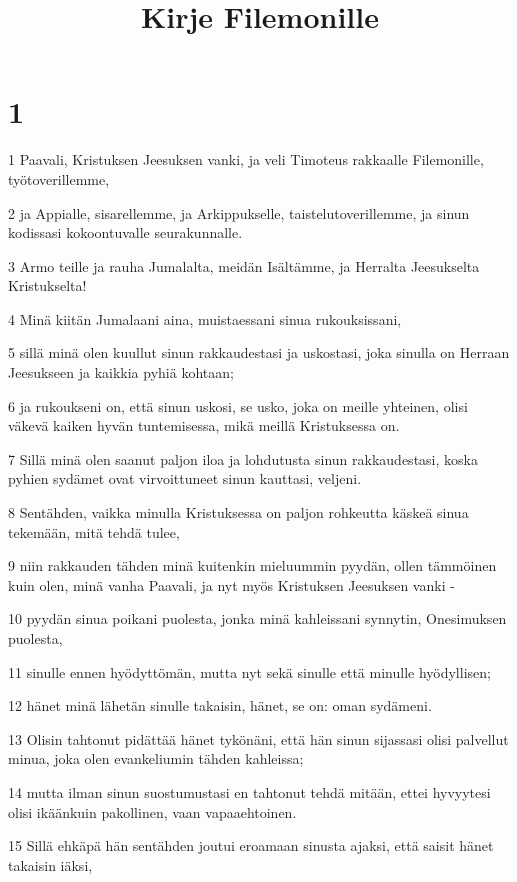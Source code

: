 

\title{Kirje Filemonille}


\chapter{1}

\par 1 Paavali, Kristuksen Jeesuksen vanki, ja veli Timoteus rakkaalle Filemonille, työtoverillemme,
\par 2 ja Appialle, sisarellemme, ja Arkippukselle, taistelutoverillemme, ja sinun kodissasi kokoontuvalle seurakunnalle.
\par 3 Armo teille ja rauha Jumalalta, meidän Isältämme, ja Herralta Jeesukselta Kristukselta!
\par 4 Minä kiitän Jumalaani aina, muistaessani sinua rukouksissani,
\par 5 sillä minä olen kuullut sinun rakkaudestasi ja uskostasi, joka sinulla on Herraan Jeesukseen ja kaikkia pyhiä kohtaan;
\par 6 ja rukoukseni on, että sinun uskosi, se usko, joka on meille yhteinen, olisi väkevä kaiken hyvän tuntemisessa, mikä meillä Kristuksessa on.
\par 7 Sillä minä olen saanut paljon iloa ja lohdutusta sinun rakkaudestasi, koska pyhien sydämet ovat virvoittuneet sinun kauttasi, veljeni.
\par 8 Sentähden, vaikka minulla Kristuksessa on paljon rohkeutta käskeä sinua tekemään, mitä tehdä tulee,
\par 9 niin rakkauden tähden minä kuitenkin mieluummin pyydän, ollen tämmöinen kuin olen, minä vanha Paavali, ja nyt myös Kristuksen Jeesuksen vanki -
\par 10 pyydän sinua poikani puolesta, jonka minä kahleissani synnytin, Onesimuksen puolesta,
\par 11 sinulle ennen hyödyttömän, mutta nyt sekä sinulle että minulle hyödyllisen;
\par 12 hänet minä lähetän sinulle takaisin, hänet, se on: oman sydämeni.
\par 13 Olisin tahtonut pidättää hänet tykönäni, että hän sinun sijassasi olisi palvellut minua, joka olen evankeliumin tähden kahleissa;
\par 14 mutta ilman sinun suostumustasi en tahtonut tehdä mitään, ettei hyvyytesi olisi ikäänkuin pakollinen, vaan vapaaehtoinen.
\par 15 Sillä ehkäpä hän sentähden joutui eroamaan sinusta ajaksi, että saisit hänet takaisin iäksi,

